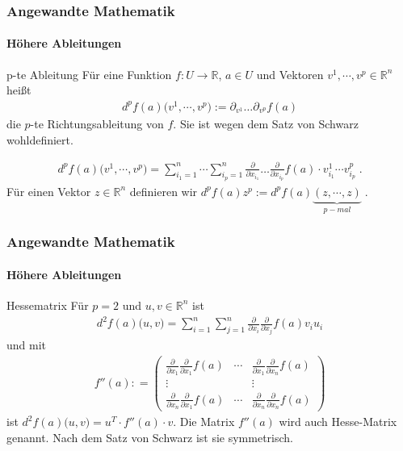 \documentclass{beamer}
\begin{document}
\begin{frame}
    \frametitle{Angewandte Mathematik}
\framesubtitle{Höhere Ableitungen}
    \begin{block}{p-te Ableitung}
Für  eine Funktion  $f: U \to \mathbb{R}$, $a \in U$ und Vektoren $v^1, \cdots , v^p \in \mathbb{R}^n$ heißt 
\begin{align*}
d^pf(a) \bigl(v^1, \cdots , v^p  ) := \partial_{v^1} \hdots \partial_{v^p} f(a)
\end{align*}
die $p$-te Richtungsableitung von $f$. Sie ist wegen dem Satz von Schwarz wohldefiniert.

\end{block}
    \begin{block}{}
\begin{align*}
d^pf(a) \bigl(v^1, \cdots , v^p  ) = \sum_{i_1 = 1}^n \cdots \sum_{i_p = 1}^n  \frac{\partial}{\partial x_{i_1}} \hdots \frac{\partial}{\partial x_{i_p}} f(a) \cdot v^1_{i_1} \cdots v^p_{i_p} \; .
\end{align*}
Für einen Vektor $z \in \mathbb{R}^n$ definieren wir $d^pf(a) z^p := d^pf(a) \underbrace{(z, \cdots , z)}_{p-mal} \;.$

\end{block}
 \end{frame}


\begin{frame}
    \frametitle{Angewandte Mathematik}
\framesubtitle{Höhere Ableitungen}
    \begin{block}{Hessematrix}
Für $p = 2$ und $u,v \in \mathbb{R}^n$ ist
\begin{align*}
d^2f(a) \bigl(u , v ) = \sum_{i = 1}^n \sum_{j = 1}^n \frac{\partial}{\partial x_{i}}  \frac{\partial}{\partial x_{j}} f(a) v_{i}  u_{i} 
\end{align*}
und mit 
\begin{align*}
f''(a) : = \begin{pmatrix}  \frac{\partial}{\partial x_{1}} \frac{\partial}{\partial x_{1}} f(a)   &  \cdots &  \frac{\partial}{\partial x_{1}} \frac{\partial}{\partial x_{n}} f(a) \\
\vdots & & \vdots  \\
 \frac{\partial}{\partial x_{n}} \frac{\partial}{\partial x_{1}} f(a)   &  \cdots &  \frac{\partial}{\partial x_{n}} \frac{\partial}{\partial x_{n}} f(a)
\end{pmatrix} 
\end{align*}
ist $d^2f(a) \bigl(u , v ) = u^T  \cdot f''(a) \cdot v$. Die Matrix $f''(a)$ wird auch Hesse-Matrix genannt. Nach dem Satz von Schwarz ist sie symmetrisch.
\end{block}
 \end{frame}
\end{document}
